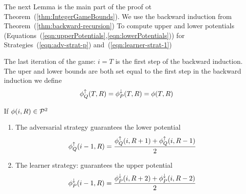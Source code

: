 \documentclass{article}[12pt]
\begin{document}
The next Lemma is the main part of the proof ot
Theorem~(\ref{thm:IntegerGameBounds}). We use the backward induction
from Theorem~(\ref{thm:backward-recursion}) To compute upper and lower
potentials (Equations~(\ref{eqn:upperPotentials},\ref{eqn:lowerPotentials})) for
Strategies~(\ref{eqn:adv-strat-p}) and~(\ref{eqn:learner-strat-1})

The last iteration of the game: $i=T$ is the first step of the
backward induction. The uper and lower bounds are both set equal to
the first step in the backward induction we define
$$  \phi_{Q}^{\uparrow}(T,R) = \phi_{P}^{\downarrow}(T,R) = \phi(T,R) $$

\begin{lemma} \label{lemma:first-order-bound}
  If $\phi(i,R) \in {\cal P}^{2}$
  \begin{enumerate}
    \item The adversarial strategy
    guarantees the lower potential
 \begin{equation} \label{eqn:backward-iteration-lower}
   \phi_{Q}^{\uparrow}(i-1, R) = \frac{\phi_{Q}^{\uparrow}(i,R+1) + \phi_{Q}^{\uparrow}(i,R-1)}{2}
 \end{equation}
   
    \item The learner strategy:
      guarantees the upper potential 
      \begin{equation} \label{eqn:backward-iteration-upper-recursion}
        \phi_{P}^{\downarrow}(i-1, R) = \frac{\phi_{P}^{\downarrow}(i,R+2) + \phi_{P}^{\downarrow}(i,R-2)}{2}
      \end{equation}
    \end{enumerate}
    
\end{lemma}
\end{document}

